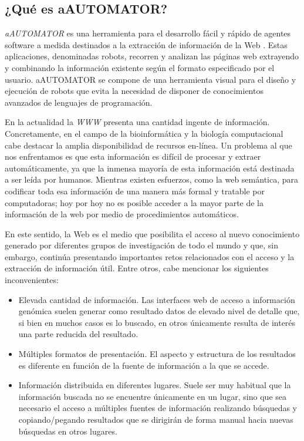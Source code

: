 \subsection{¿Qué es aAUTOMATOR?}
\emph{aAUTOMATOR} es una herramienta para el desarrollo fácil y rápido
de agentes software a medida destinados a la extracción de información
de la Web \cite{aAUTOMATOR}. Estas aplicaciones, denominadas robots,
recorren y analizan las páginas web extrayendo y combinando la
información existente según el formato especificado por el
usuario. aAUTOMATOR se compone de una herramienta visual para el
diseño y ejecución de robots que evita la necesidad de disponer de
conocimientos avanzados de lenguajes de programación.

En la actualidad la \emph{WWW} presenta una cantidad ingente de
información. Concretamente, en el campo de la bioinformática y la
biología computacional cabe destacar la amplia disponibilidad de
recursos en-línea.  Un problema al que nos enfrentamos es que esta
información es difícil de procesar y extraer automáticamente, ya que
la inmensa mayoría de esta información está destinada a ser leída por
humanos. Mientras existen esfuerzos, como la web semántica, para
codificar toda esa información de una manera más formal y tratable por
computadoras; hoy por hoy no es posible acceder a la mayor parte de la
información de la web por medio de procedimientos automáticos.

En este sentido, la Web es el medio que posibilita el acceso al nuevo
conocimiento generado por diferentes grupos de investigación de todo
el mundo y que, sin embargo, continúa presentando importantes retos
relacionados con el acceso y la extracción de información
útil. Entre otros, cabe mencionar los siguientes inconvenientes:
\begin{itemize}
\item Elevada cantidad de información. Las interfaces web de acceso a
  información genómica suelen generar como resultado datos de elevado
  nivel de detalle que, si bien en muchos casos es lo buscado, en
  otros únicamente resulta de interés una parte reducida del
  resultado.
\item Múltiples formatos de presentación. El aspecto y estructura de
  los resultados es diferente en función de la fuente de información a
  la que se accede.
\item Información distribuida en diferentes lugares. Suele ser muy
  habitual que la información buscada no se encuentre únicamente en un
  lugar, sino que sea necesario el acceso a múltiples fuentes de
  información realizando búsquedas y copiando/pegando resultados que
  se dirigirán de forma manual hacia nuevas búsquedas en otros
  lugares.
\end{itemize}

